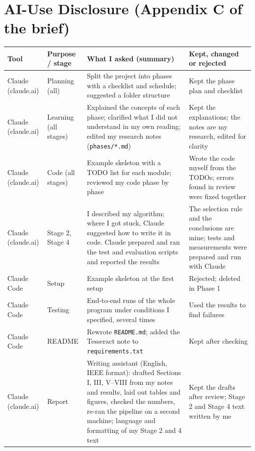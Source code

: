 \documentclass[conference]{IEEEtran}
\begin{document}
\section{AI-Use Disclosure (Appendix C of the brief)}
{\footnotesize
\setlength{\tabcolsep}{3pt}
\begin{tabularx}{\linewidth}{@{}>{\raggedright\arraybackslash}p{1.1cm} >{\raggedright\arraybackslash}p{1.25cm} >{\raggedright\arraybackslash}X >{\raggedright\arraybackslash}p{2.3cm}@{}}
\toprule
Tool & Purpose / stage & What I asked (summary) & Kept, changed or rejected\\
\midrule
Claude (claude.ai) & Planning (all) & Split the project into phases with a checklist and schedule; suggested a folder structure & Kept the phase plan and checklist\\
Claude (claude.ai) & Learning (all stages) & Explained the concepts of each phase; clarified what I did not understand in my own reading; edited my research notes (\texttt{phases/*.md}) & Kept the explanations; the notes are my research, edited for clarity\\
Claude (claude.ai) & Code (all stages) & Example skeleton with a TODO list for each module; reviewed my code phase by phase & Wrote the code myself from the TODOs; errors found in review were fixed together\\
Claude (claude.ai) & Stage 2, Stage 4 & I described my algorithm; where I got stuck, Claude suggested how to write it in code. Claude prepared and ran the test and evaluation scripts and reported the results & The selection rule and the conclusions are mine; tests and measurements were prepared and run with Claude\\
Claude Code & Setup & Example skeleton at the first setup & Rejected; deleted in Phase 1\\
Claude Code & Testing & End-to-end runs of the whole program under conditions I specified, several times & Used the results to find failures\\
Claude Code & README & Rewrote \texttt{README.md}; added the Tesseract note to \texttt{requirements.txt} & Kept after checking\\
Claude (claude.ai) & Report & Writing assistant (English, IEEE format): drafted Sections I, III, V--VIII from my notes and results, laid out tables and figures, checked the numbers, re-ran the pipeline on a second machine; language and formatting of my Stage 2 and 4 text & Kept the drafts after review; Stage 2 and Stage 4 text written by me\\
\bottomrule
\end{tabularx}
}
\end{document}
